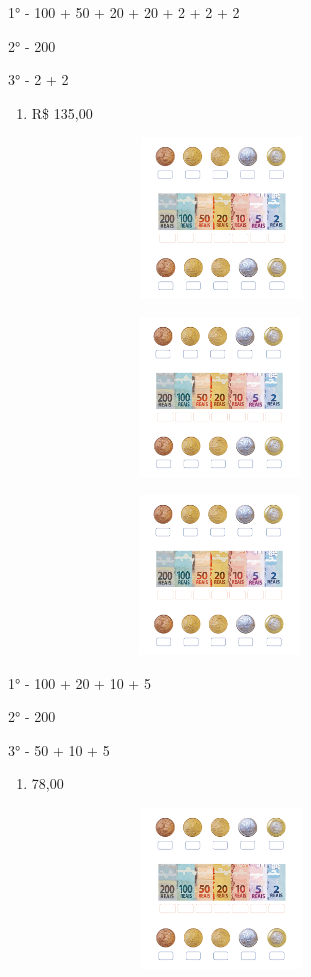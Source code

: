 1° - 100 + 50 + 20 + 20 + 2 + 2 + 2

2° - 200

3° - 2 + 2

\begin{enumerate}
\def\labelenumi{\alph{enumi})}
\item
  R\$ 135,00
\end{enumerate}

\includegraphics[width=4.45833in,height=1.68116in]{media/image72.png}

\includegraphics[width=4.40625in,height=1.66152in]{media/image72.png}

\includegraphics[width=4.40625in,height=1.66152in]{media/image72.png}

1° - 100 + 20 + 10 + 5

2° - 200

3° - 50 + 10 + 5

\begin{enumerate}
\def\labelenumi{\alph{enumi})}
\item
  78,00
\end{enumerate}

\includegraphics[width=4.45833in,height=1.68116in]{media/image72.png}

